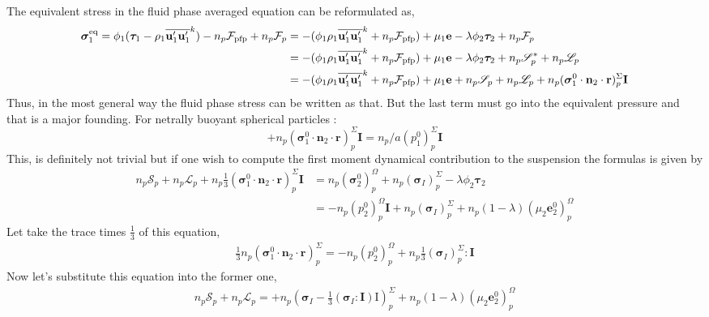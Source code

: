 The equivalent stress in the fluid phase averaged equation can be reformulated as, 
\begin{align*}
    \bm{\sigma}_1^\text{eq}
    = \phi_1(
    \bm{\tau}_1%
    - \rho_1 
    \kavg{\textbf{u}_1'\textbf{u}_1'})
    - n_p \mathcal{F}_\text{pfp} + n_p \mathcal{F}_p
    &= - (\phi_1 \rho_1  \kavg{\textbf{u}_1'\textbf{u}_1'}
        + n_p \mathcal{F}_\text{pfp})
        + \mu_1 \textbf{e} 
        - \lambda \phi_2 \bm{\tau}_2
         + n_p \mathcal{F}_p\\
    &= - (\phi_1 \rho_1  \kavg{\textbf{u}_1'\textbf{u}_1'}
        + n_p \mathcal{F}_\text{pfp})
        + \mu_1 \textbf{e} 
        - \lambda \phi_2 \bm{\tau}_2
         + n_p \mathscr{S}_p^*
         + n_p \mathscr{L}_p\\
    &= - (\phi_1 \rho_1  \kavg{\textbf{u}_1'\textbf{u}_1'}
        + n_p \mathcal{F}_\text{pfp})
        + \mu_1 \textbf{e} 
         + n_p \mathscr{S}_p
         + n_p \mathscr{L}_p
         + n_p (\bm{\sigma}_1^0 \cdot \textbf{n}_2 \cdot\textbf{r})_p^\Sigma \textbf{I}
\end{align*}
Thus, in the most general way the fluid phase stress can be written as that. 
But the last term must go into the equivalent pressure and that is a major founding. 
For netrally buoyant spherical particles : 
\begin{equation*}
    + n_p (\bm{\sigma}_1^0 \cdot \textbf{n}_2 \cdot\textbf{r})_p^\Sigma \textbf{I}
    = 
    n_p/a (p_1^0 )_p^\Sigma \textbf{I}
\end{equation*}
This, is definitely not trivial but if one wish to compute the first moment dynamical contribution to the suspension the formulas is given by 
\begin{align*}
    n_p \mathscr{S}_p
+ n_p \mathscr{L}_p
+ n_p\frac{1}{3}(\bm{\sigma}_1^0 \cdot \textbf{n}_2 \cdot \textbf{r})_p^\Sigma \textbf{I}
    &= 
    n_p \left(
        \bm{\sigma}_2^0
    \right)_p^\Omega
    +n_p (\bm{\sigma}_I)^\Sigma_p
    - \lambda \phi_2 \bm{\tau}_2\\
    &= 
    - n_p \left(
        p_2^0
    \right)_p^\Omega \textbf{I}
    +n_p (\bm{\sigma}_I)^\Sigma_p
    + n_p (1 - \lambda)\left(
        \mu_2 \textbf{e}_2^0
    \right)_p^\Omega 
\end{align*}
Let take the trace times $\frac{1}{3}$ of this equation, 
\begin{align*}
    \frac{1}{3} n_p(\bm{\sigma}_1^0 \cdot \textbf{n}_2 \cdot \textbf{r})_p^\Sigma 
    = 
    - n_p \left(
        p_2^0
    \right)_p^\Omega 
    +n_p \frac{1}{3}(\bm{\sigma}_I)^\Sigma_p : \textbf{I}
\end{align*}
Now let's substitute this equation into the former one, 
\begin{align*}
    n_p \mathscr{S}_p
+ n_p \mathscr{L}_p
=
    +n_p (\bm{\sigma}_I - \frac{1}{3}(\bm{\sigma}_I : \textbf{I})\text{I})^\Sigma_p
    + n_p (1 - \lambda)\left(
        \mu_2 \textbf{e}_2^0
    \right)_p^\Omega 
\end{align*}

